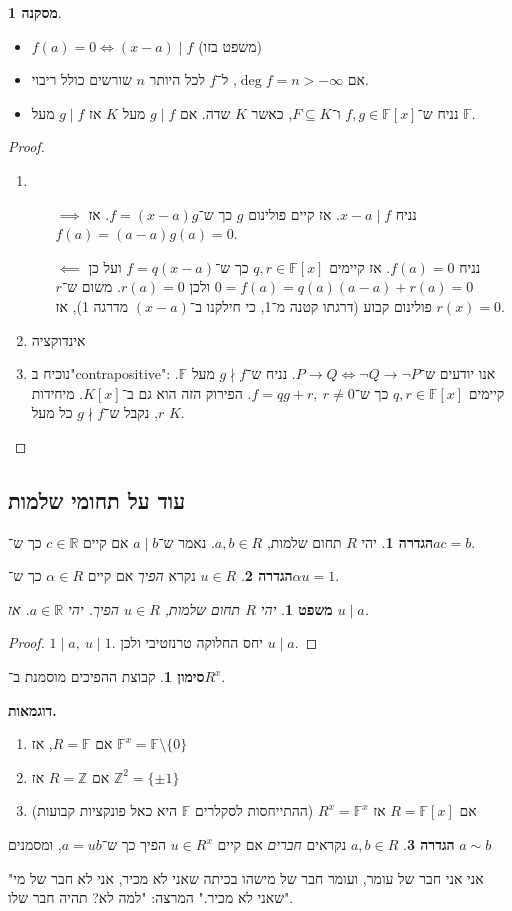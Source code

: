 \documentclass[]{article}
\newcommand\Z     {\mathbb{Z}}
\newcommand\R     {\mathbb{R}}
\renewcommand\inf {\infty}
\newcommand\F         {\mathbb{F}}
\newcommand\ag        {\alpha}
\newtheorem{Theorem}{משפט}
\theoremstyle{definition}
\newtheorem{definition}{הגדרה}
\newtheorem{Notion}{סימון}
\newtheorem{Collary}{מסקנה}
\newcommand\cola [1] {\begin{Collary}#1\end{Collary}}
\newcommand\theo  [1] {\begin{Theorem}#1\end{Theorem}}
\newcommand\defi  [1] {\begin{definition}#1\end{definition}}
\newcommand\noti  [1] {\begin{Notion}#1\end{Notion}}
\begin{document}
	\cola{\,
	\begin{itemize}
		\item $f(a) = 0 \iff (x - a) \mid f$ (משפט בזו)
		\item אם $\deg f = n > -\inf$, ל־$f$ לכל היותר $n$ שורשים כולל ריבוי. 
		\item נניח ש־$f, g \in \F[x]$ ו־$F \subseteq K$, כאשר $K$ שדה. אם $g \mid f$ מעל $K$ אז $g \mid f$ מעל $\F$. 
	\end{itemize}
	}
	\begin{proof}
		\begin{enumerate}\,
			\item \begin{itemize}
				\item[$\implies$] נניח $x - a \mid f$. אז קיים פולינום $g$ כך ש־$f = (x - a)g$. אז $f(a) = (a - a)g(a) = 0$. 
				\item[$\impliedby$] נניח $f(a) = 0$. אז קיימים $q, r \in \F[x]$ כך ש־$f = q(x - a)$ ועל כן $0 = f(a) = q(a)(a - a) + r(a) = 0$ ולכן $r(a) = 0$. משום ש־$r$ פולינום קבוע (דרגתו קטנה מ־1, כי חילקנו ב־$(x - a)$ מדרגה 1), אז $r(x) = 0$. 
			\end{itemize}
			\item אינדוקציה
			\item נוכיח ב"contrapositive": אנו יודעים ש־$P \to Q \iff \lnot Q \to \lnot P$. נניח ש־$g \nmid f$ מעל $\F$. קיימים $q, r \in \F[x]$ כך ש־$f =qg + r, \ r \neq 0$. הפירוק הזה הוא גם ב־$K[x]$. מיחידות $r$, נקבל ש־$g \nmid f$ כל מעל $K$. 
		\end{enumerate}
	\end{proof}
	
	\subsection{עוד על תחומי שלמות}
	\defi{יהי $R$ תחום שלמות, $a, b \in R$. נאמר ש־$a \mid b$ אם קיים $c \in \R$ כך ש־$ac = b$. }
	\defi{$u \in R$ נקרא \textit{הפיך} אם קיים $\ag \in R$ כך ש־$\ag u = 1$. }
	\theo{יהי $R$ תחום שלמות, $u \in R$ הפיך. יהי $a \in \R$. אז $u \mid a$. }\begin{proof}
		$1 \mid a, \ u \mid 1$. יחס החלוקה טרנזטיבי ולכן $u \mid a$. 
	\end{proof}
	\noti{קבוצת ההפיכים מוסמנת ב־$R^x$. }
	\textbf{דוגמאות. }
	\begin{enumerate}
		\item אם $R = \F$, אז $\F^x = \F \setminus \{0\}$
		\item אם $R = \Z$ אז $\Z^2 = \{\pm 1\}$
		\item אם $R = \F[x]$ אז $R^x = \F^x$ (ההתייחסות לסקלרים $\F$ היא כאל פונקציות קבועות)
	\end{enumerate}
	\defi{$a, b \in R$ נקראים \textit{חברים} אם קיים $u \in R^x$ הפיך כך ש־$a = ub$, ומסמנים $a \sim b$ }
	"אני אני חבר של עומר, ועומר חבר של מישהו בכיתה שאני לא מכיר, אני לא חבר של מי שאני לא מכיר." המרצה: "למה לא? תהיה חבר שלו". 
	
\end{document}
